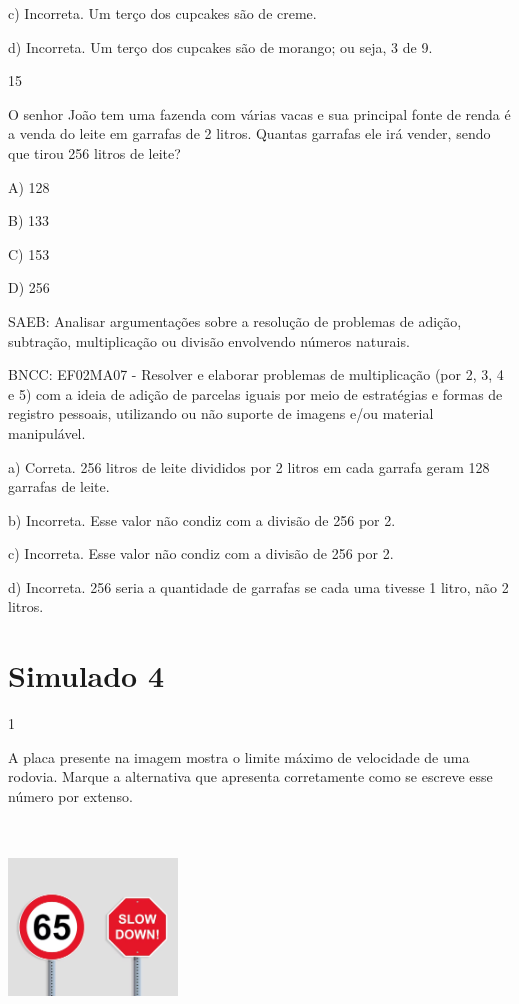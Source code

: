 \begin{escolha}
\begin{escolha}
{{{{c) Incorreta. Um terço dos cupcakes são de creme.

d) Incorreta. Um terço dos cupcakes são de morango; ou seja, 3 de 9.

\num{15}

O senhor João tem uma fazenda com várias vacas e sua principal fonte de renda é a venda do leite em garrafas de 2 litros. Quantas
garrafas ele irá vender, sendo que tirou 256 litros de leite?

A) 128

B) 133

C) 153

D) 256

SAEB: Analisar argumentações sobre a resolução de problemas de
adição, subtração, multiplicação ou divisão envolvendo números naturais.

BNCC: EF02MA07 - Resolver e elaborar problemas de multiplicação (por 2,
3, 4 e 5) com a ideia de adição de parcelas iguais por meio de
estratégias e formas de registro pessoais, utilizando ou não suporte de
imagens e/ou material manipulável.

a) Correta. 256 litros de leite divididos por 2 litros em cada garrafa geram 128 garrafas de leite.

b) Incorreta. Esse valor não condiz com a divisão de 256 por 2.

c) Incorreta. Esse valor não condiz com a divisão de 256 por 2.

d) Incorreta. 256 seria a quantidade de garrafas se cada uma tivesse 1 litro, não 2 litros.

\chapter{Simulado 4}

\num{1}

A placa presente na imagem mostra o limite máximo de velocidade de uma
rodovia. Marque a alternativa que apresenta corretamente como se escreve
esse número por extenso.

\includegraphics[width=1.77359in,height=2.21876in]{media/image162.png}

}}}}
\end{escolha}
\end{escolha}
